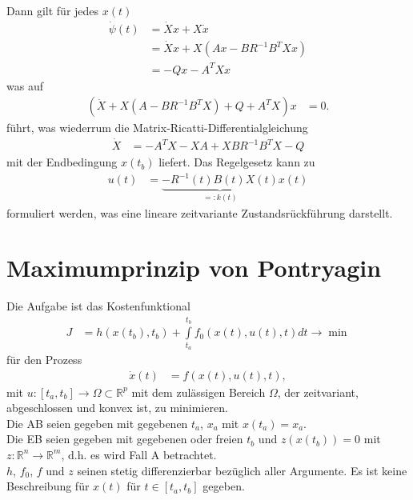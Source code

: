 Dann gilt für jedes $x(t)$
\begin{align*}
	\dot{\psi}(t) & = \dot{X}x + X\dot{x}\\
	& = \dot{X}x + X\left(Ax-BR^{-1}B^TXx \right)\\
	& = -Qx-A^TXx
\end{align*}
was auf
\begin{align*}
	\left(\dot{X} + X\left(A-BR^{-1}B^TX \right) + Q +A^TX \right)x & = 0.
\end{align*}
führt, was wiederrum die Matrix-Ricatti-Differentialgleichung
\begin{align*}
	\dot{X} & = -A^TX -XA + XBR^{-1}B^TX -Q
\end{align*}
mit der Endbedingung $x(t_b)$ liefert. Das Regelgesetz kann zu
\begin{align*}
	u(t) & = \underbrace{-R^{-1}(t)B(t)X(t)}_{=:k(t)}x(t)
\end{align*}
formuliert werden, was eine lineare zeitvariante Zustandsrückführung darstellt.

\section{Maximumprinzip von Pontryagin}
Die Aufgabe ist das Kostenfunktional
\begin{align*}
	J & = h\left(x(t_b),t_b \right) + \int\limits_{t_a}^{t_b} f_0(x(t),u(t),t)dt\rightarrow\min
\end{align*}
für den Prozess
\begin{align*}
	\dot{x}(t) & = f\left( x(t),u(t),t \right),
\end{align*}
mit $u:[t_a,t_b]\rightarrow \Omega\subset\mathbb{R}^p$ mit dem zulässigen Bereich $\Omega$, der zeitvariant, abgeschlossen und konvex ist, zu
minimieren.\\
Die \ac{AB} seien gegeben mit gegebenen $t_a$, $x_a$ mit $x(t_a)=x_a$.\\
Die \ac{EB} seien gegeben mit gegebenen oder freien $t_b$ und $z(x(t_b))=0$ mit $z:\mathbb{R}^n\rightarrow\mathbb{R}^m$, d.h. es wird Fall A
betrachtet.\\
$h$, $f_0$, $f$ und $z$ seinen stetig differenzierbar bezüglich aller Argumente. Es ist keine Beschreibung für $x(t)$ für $t\in[t_a,t_b]$ gegeben.

